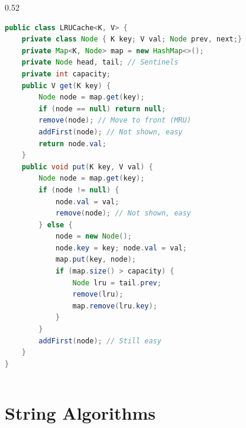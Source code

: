 \documentclass[8pt,aspectratio=169]{beamer}
\begin{document}
\begin{frame}[fragile]
\begin{columns}[T]
    \begin{column}{0.52\textwidth}
\begin{lstlisting}[language=Java, basicstyle=\tiny\ttfamily, keywordstyle=\color{blue}, frame=single]
public class LRUCache<K, V> {
    private class Node { K key; V val; Node prev, next;}
    private Map<K, Node> map = new HashMap<>();
    private Node head, tail; // Sentinels
    private int capacity;
    public V get(K key) {
        Node node = map.get(key);
        if (node == null) return null;
        remove(node); // Move to front (MRU)
        addFirst(node); // Not shown, easy
        return node.val;
    }
    public void put(K key, V val) {
        Node node = map.get(key);
        if (node != null) {
            node.val = val;
            remove(node); // Not shown, easy
        } else {
            node = new Node();
            node.key = key; node.val = val;
            map.put(key, node);
            if (map.size() > capacity) {
                Node lru = tail.prev;
                remove(lru);
                map.remove(lru.key);
            }
        }
        addFirst(node); // Still easy
    }
}
\end{lstlisting}
    \end{column}
\end{columns}

\end{frame}


\section{String Algorithms}
\end{document}
